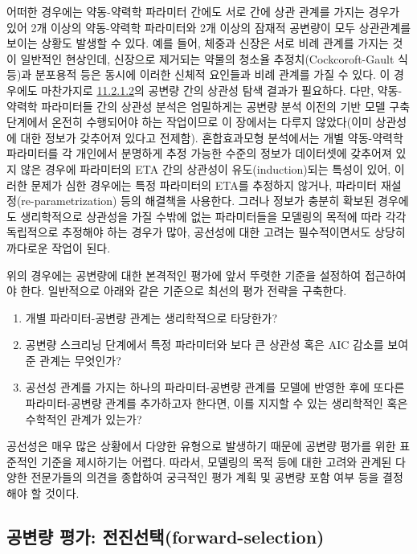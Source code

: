 \documentclass[
  10pt,
  krantz2,
  a4paper]{krantz}
\providecommand{\tightlist}{%
  \setlength{\itemsep}{0pt}\setlength{\parskip}{0pt}}
\theoremstyle{definition}
\theoremstyle{definition}
\theoremstyle{definition}
\theoremstyle{remark}
\begin{document}
어떠한 경우에는 약동-약력학 파라미터 간에도 서로 간에 상관 관계를 가지는 경우가 있어 2개 이상의 약동-약력학 파라미터와 2개 이상의 잠재적 공변량이 모두 상관관계를 보이는 상황도 발생할 수 있다. 예를 들어, 체중과 신장은 서로 비례 관계를 가지는 것이 일반적인 현상인데, 신장으로 제거되는 약물의 청소율 추정치(Cockcoroft-Gault 식 등)과 분포용적 등은 동시에 이러한 신체적 요인들과 비례 관계를 가질 수 있다. 이 경우에도 마찬가지로 \protect\hyperlink{potential-cov}{11.2.1.2}의 공변량 간의 상관성 탐색 결과가 필요하다. 다만, 약동-약력학 파라미터들 간의 상관성 분석은 엄밀하게는 공변량 분석 이전의 기반 모델 구축 단계에서 온전히 수행되어야 하는 작업이므로 이 장에서는 다루지 않았다(이미 상관성에 대한 정보가 갖추어져 있다고 전제함). 혼합효과모형 분석에서는 개별 약동-약력학 파라미터를 각 개인에서 분명하게 추정 가능한 수준의 정보가 데이터셋에 갖추어져 있지 않은 경우에 파라미터의 ETA 간의 상관성이 유도(induction)되는 특성이 있어, 이러한 문제가 심한 경우에는 특정 파라미터의 ETA를 추정하지 않거나, 파라미터 재설정(re-parametrization) 등의 해결책을 사용한다. 그러나 정보가 충분히 확보된 경우에도 생리학적으로 상관성을 가질 수밖에 없는 파라미터들을 모델링의 목적에 따라 각각 독립적으로 추정해야 하는 경우가 많아, 공선성에 대한 고려는 필수적이면서도 상당히 까다로운 작업이 된다.

위의 경우에는 공변량에 대한 본격적인 평가에 앞서 뚜렷한 기준을 설정하여 접근하여야 한다. 일반적으로 아래와 같은 기준으로 최선의 평가 전략을 구축한다.

\begin{enumerate}
\def\labelenumi{\arabic{enumi}.}
\tightlist
\item
  개별 파라미터-공변량 관계는 생리학적으로 타당한가?
\item
  공변량 스크리닝 단계에서 특정 파라미터와 보다 큰 상관성 혹은 AIC 감소를 보여준 관계는 무엇인가?
\item
  공선성 관계를 가지는 하나의 파라미터-공변량 관계를 모델에 반영한 후에 또다른 파라미터-공변량 관계를 추가하고자 한다면, 이를 지지할 수 있는 생리학적인 혹은 수학적인 관계가 있는가?
\end{enumerate}

공선성은 매우 많은 상황에서 다양한 유형으로 발생하기 때문에 공변량 평가를 위한 표준적인 기준을 제시하기는 어렵다. 따라서, 모델링의 목적 등에 대한 고려와 관계된 다양한 전문가들의 의견을 종합하여 궁극적인 평가 계획 및 공변량 포함 여부 등을 결정해야 할 것이다.

\hypertarget{uxacf5uxbcc0uxb7c9-uxd3c9uxac00-uxc804uxc9c4uxc120uxd0ddforward-selection}{%
\subsection{공변량 평가: 전진선택(forward-selection)}\label{uxacf5uxbcc0uxb7c9-uxd3c9uxac00-uxc804uxc9c4uxc120uxd0ddforward-selection}}
\end{document}
